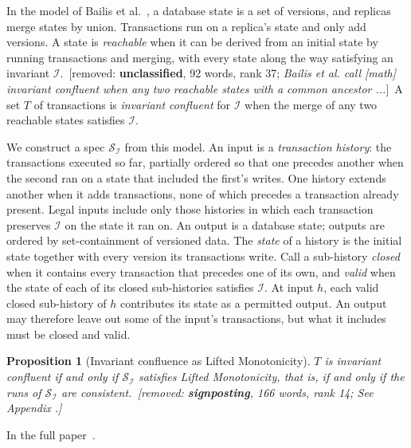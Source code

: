 \documentclass[sigconf]{cidr-2027}
\makeatletter
\newtheorem{proposition}{Proposition}
\theoremstyle{remark}
\newcommand{\inrel}{extends\xspace}          %
\newcommand{\Spec}{\mathcal{S}}
\newcommand{\proofinfull}{\par\pushQED{\qed}\normalfont\topsep2\p@\relax
  \trivlist\item[\@proofindent\hskip\labelsep{\@proofnamefont\proofname\@addpunct{.}}]%
  \ignorespaces In the full paper~\cite{hellerstein2026completecalmfull}.%
  \popQED\endtrivlist\@endpefalse}
\newcommand{\removednote}[1]{{\color{cutred}\footnotesize\,[removed: #1]\,}}
\makeatother
\begin{document}
\textcolor{newblue}{In the model of Bailis et al.~\cite{bailis2014coordination}, a database state
is a set of versions, and replicas merge states by union.} \textcolor{newblue}{Transactions run on
a replica's state and only add versions.} \textcolor{newblue}{A state is \emph{reachable} when it
can be derived from an initial state by running transactions and merging, with
every state along the way satisfying an invariant $\mathcal I$.} \removednote{\textbf{unclassified}, 92 words, rank 37; \textit{Bailis et al. call [math] invariant confluent when any two reachable states with a common ancestor ...}} \textcolor{newblue}{A set $T$ of
transactions is \emph{invariant confluent} for $\mathcal I$ when the merge of
any two reachable states satisfies $\mathcal I$.}

\textcolor{newblue}{We construct a spec $\Spec_{\mathcal I}$ from this model.} \textcolor{newblue}{An input is a
\emph{transaction history}: the transactions executed so far, partially
ordered so that one precedes another when the second ran on a state that
included the first's writes.} \textcolor{newblue}{One history \inrel another when it adds
transactions, none of which precedes a transaction already present.} \textcolor{newblue}{Legal
inputs include only those histories in which each transaction preserves
$\mathcal I$ on the state it ran on.} \textcolor{newblue}{An output is a database state; outputs
are ordered by set-containment of versioned data.} \textcolor{newblue}{The \emph{state} of a
history is the initial state together with every version its transactions
write.} \textcolor{newblue}{Call a sub-history \emph{closed} when it contains every transaction
that precedes one of its own, and \emph{valid} when the state of each of its
closed sub-histories satisfies $\mathcal I$.} At input $h$, each valid
closed sub-history of $h$ contributes its state as a permitted output. An output may therefore leave out some of the input's transactions, but what
it includes must be closed and valid.

\begin{proposition}[Invariant confluence as Lifted Monotonicity]
\label{prop:iconfluence-lm}
$T$ is invariant confluent if and only if $\Spec_{\mathcal I}$ satisfies Lifted
Monotonicity, that is, if and only if the runs of $\Spec_{\mathcal I}$ are consistent. \removednote{\textbf{signposting}, 166 words, rank 14; \textit{See Appendix .}}
\end{proposition}
\textcolor{newblue}{\proofinfull}
\end{document}
